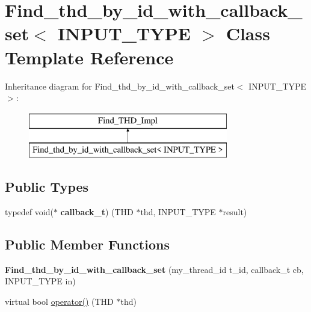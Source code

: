 \hypertarget{classFind__thd__by__id__with__callback__set}{}\section{Find\+\_\+thd\+\_\+by\+\_\+id\+\_\+with\+\_\+callback\+\_\+set$<$ I\+N\+P\+U\+T\+\_\+\+T\+Y\+PE $>$ Class Template Reference}
\label{classFind__thd__by__id__with__callback__set}
Inheritance diagram for Find\+\_\+thd\+\_\+by\+\_\+id\+\_\+with\+\_\+callback\+\_\+set$<$ I\+N\+P\+U\+T\+\_\+\+T\+Y\+PE $>$\+:\begin{figure}[H]
\begin{center}
\leavevmode
\includegraphics[height=2.000000cm]{classFind__thd__by__id__with__callback__set}
\end{center}
\end{figure}
\subsection*{Public Types}
\begin{DoxyCompactItemize}
\item 
\mbox{\label{classFind__thd__by__id__with__callback__set_af49db01fd275588fdaebcc9586c2c040}} 
typedef void($\ast$ {\bfseries callback\+\_\+t}) (T\+HD $\ast$thd, I\+N\+P\+U\+T\+\_\+\+T\+Y\+PE $\ast$result)
\end{DoxyCompactItemize}
\subsection*{Public Member Functions}
\begin{DoxyCompactItemize}
\item 
\mbox{\label{classFind__thd__by__id__with__callback__set_a06d7e976c5a266f5174d985e4dac7cc4}} 
{\bfseries Find\+\_\+thd\+\_\+by\+\_\+id\+\_\+with\+\_\+callback\+\_\+set} (my\+\_\+thread\+\_\+id t\+\_\+id, callback\+\_\+t cb, I\+N\+P\+U\+T\+\_\+\+T\+Y\+PE in)
\item 
virtual bool \mbox{\hyperlink{classFind__thd__by__id__with__callback__set_a3a8c6f9be71c9572a34fece05ef95add}{operator()}} (T\+HD $\ast$thd)
\end{DoxyCompactItemize}


